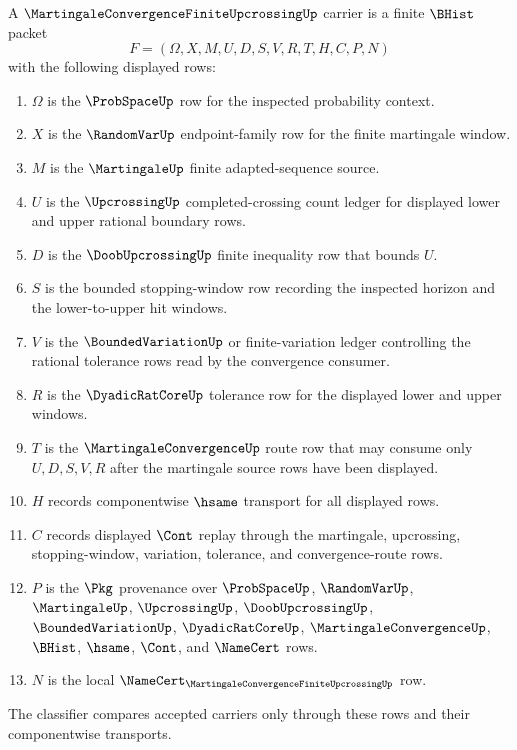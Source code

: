 \begin{definition}
\label{def:martingale-convergence-finite-upcrossing-carrier}
A $\MartingaleConvergenceFiniteUpcrossingUp$ carrier is a finite $\BHist$
packet
$$
F=(\Omega,X,M,U,D,S,V,R,T,H,C,P,N)
$$
with the following displayed rows:
\begin{enumerate}
\item $\Omega$ is the $\ProbSpaceUp$ row for the inspected probability context.
\item $X$ is the $\RandomVarUp$ endpoint-family row for the finite martingale
window.
\item $M$ is the $\MartingaleUp$ finite adapted-sequence source.
\item $U$ is the $\UpcrossingUp$ completed-crossing count ledger for displayed
lower and upper rational boundary rows.
\item $D$ is the $\DoobUpcrossingUp$ finite inequality row that bounds $U$.
\item $S$ is the bounded stopping-window row recording the inspected horizon and
the lower-to-upper hit windows.
\item $V$ is the $\BoundedVariationUp$ or finite-variation ledger controlling
the rational tolerance rows read by the convergence consumer.
\item $R$ is the $\DyadicRatCoreUp$ tolerance row for the displayed lower and
upper windows.
\item $T$ is the $\MartingaleConvergenceUp$ route row that may consume only
$U,D,S,V,R$ after the martingale source rows have been displayed.
\item $H$ records componentwise $\hsame$ transport for all displayed rows.
\item $C$ records displayed $\Cont$ replay through the martingale, upcrossing,
stopping-window, variation, tolerance, and convergence-route rows.
\item $P$ is the $\Pkg$ provenance over $\ProbSpaceUp$, $\RandomVarUp$,
$\MartingaleUp$, $\UpcrossingUp$, $\DoobUpcrossingUp$,
$\BoundedVariationUp$, $\DyadicRatCoreUp$, $\MartingaleConvergenceUp$,
$\BHist$, $\hsame$, $\Cont$, and $\NameCert$ rows.
\item $N$ is the local
$\NameCert_{\MartingaleConvergenceFiniteUpcrossingUp}$ row.
\end{enumerate}
The classifier compares accepted carriers only through these rows and their
componentwise transports.
\end{definition}

